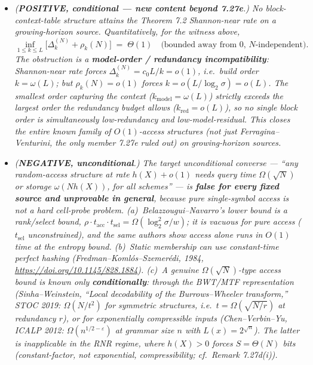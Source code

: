 \documentclass[
]{article}
\begin{document}
\begin{itemize}
\item[\emph{(i)}] \emph{(\textbf{POSITIVE, conditional --- new content
beyond 7.27e}.) No block-context-table structure attains the Theorem 7.2
Shannon-near rate on a growing-horizon source. Quantitatively, for the
witness above,}
\[
  \inf_{1 \leq k \leq L}\bigl[\Delta_k^{(N)} + \rho_k(N)\bigr]
  \;=\; \Theta(1) \quad\text{(bounded away from $0$, $N$-independent).}
\]
\emph{The obstruction is a \textbf{model-order / redundancy
incompatibility}: Shannon-near rate forces $\Delta_k^{(N)} = c_0 L/k =
o(1)$, i.e.\ build order $k = \omega(L)$; but $\rho_k(N) = o(1)$ forces
$k = o(L/\log_2\sigma) = o(L)$. The smallest order capturing the context
($k_{\mathrm{model}} = \omega(L)$) strictly exceeds the largest order the
redundancy budget allows ($k_{\mathrm{red}} = o(L)$), so no single block
order is simultaneously low-redundancy and low-model-residual. This
closes the \emph{entire known family} of $O(1)$-access structures (not
just Ferragina--Venturini, the only member 7.27e ruled out) on
growing-horizon sources.}
\item[\emph{(ii)}] \emph{(\textbf{NEGATIVE, unconditional}.) The target
\emph{unconditional} converse --- ``any random-access structure at rate
$h(X)+o(1)$ needs query time $\Omega(\sqrt N)$ or storage $\omega(N
h(X))$, for all schemes'' --- is \textbf{false for every fixed source and
unprovable in general}, because pure single-symbol \emph{access} is not a
hard cell-probe problem. (a)~Belazzougui--Navarro's lower bound is a
\emph{rank}/\emph{select} bound, $\rho\cdot t_{\mathrm{acc}}\cdot
t_{\mathrm{sel}} = \Omega(\log_2^2\sigma/w)$; it is vacuous for pure
access ($t_{\mathrm{sel}}$ unconstrained), and the same authors show
access alone runs in $O(1)$ time at the entropy bound. (b)~Static membership can use constant-time perfect hashing
(Fredman--Koml\'os--Szemer\'edi, 1984, \url{https://doi.org/10.1145/828.1884}).
(c)~A genuine $\Omega(\sqrt N)$-type access bound is known only
\textbf{conditionally}: through the BWT/MTF representation
(Sinha--Weinstein, ``Local decodability of the Burrows--Wheeler
transform,'' STOC 2019: $\Omega(N/t^2)$ for symmetric structures, i.e.\
$t = \Omega(\sqrt{N/r})$ at redundancy $r$), or for \emph{exponentially}
compressible inputs (Chen--Verbin--Yu, ICALP 2012: $\Omega(n^{1/2
-\varepsilon})$ at grammar size $n$ with $L(x) = 2^{\sqrt n}$). The latter
is inapplicable in the RNR regime, where $h(X) > 0$ forces $S = \Theta(N)$
bits (constant-factor, not exponential, compressibility; cf.\ Remark
7.27d(i)).}
\end{itemize}
\end{document}
